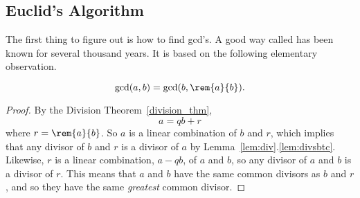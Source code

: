 


\subsection{Euclid's Algorithm}
The first thing to figure out is how to find gcd's.  A good way called
 has been known for several thousand years.
It is based on the following elementary observation.

\begin{lemma}\label{lem:gcd}
\[
\gcd(a, b) = \gcd(b, \rem{a}{b}).
\]

\begin{proof}
By the Division Theorem~\ref{division_thm}, 
\begin{equation}\label{aqbrprf}
a = qb + r
\end{equation}
where $r = \rem{a}{b}$.  So $a$ is a linear combination of $b$ and
$r$, which implies that any divisor of $b$ and $r$ is a divisor of $a$
by Lemma~\ref{lem:div}.\ref{lem:divsbtc}.  Likewise, $r$ is a linear
combination, $a-qb$, of $a$ and $b$, so any divisor of $a$ and $b$ is
a divisor of $r$.  This means that $a$ and $b$ have the same common
divisors as $b$ and $r$, and so they have the same \emph{greatest}
common divisor.
\end{proof}
\end{lemma}

